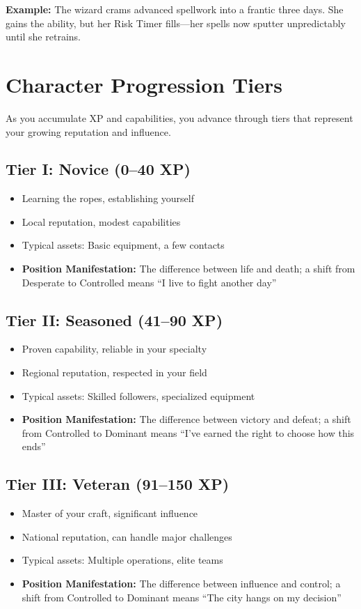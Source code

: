 \documentclass[11pt,twoside,openany]{book}
\begin{document}
\textbf{Example:} The wizard crams advanced spellwork into a frantic three days. She gains the ability, but her Risk Timer fills---her spells now sputter unpredictably until she retrains.

\section*{Character Progression Tiers}

As you accumulate XP and capabilities, you advance through tiers that represent your growing reputation and influence.

\subsection{Tier I: Novice (0--40 XP)}
\begin{itemize}
\item Learning the ropes, establishing yourself
\item Local reputation, modest capabilities
\item Typical assets: Basic equipment, a few contacts
\item \textbf{Position Manifestation:} The difference between life and death; a shift from Desperate to Controlled means ``I live to fight another day''
\end{itemize}

\subsection{Tier II: Seasoned (41--90 XP)}
\begin{itemize}
\item Proven capability, reliable in your specialty
\item Regional reputation, respected in your field
\item Typical assets: Skilled followers, specialized equipment
\item \textbf{Position Manifestation:} The difference between victory and defeat; a shift from Controlled to Dominant means ``I've earned the right to choose how this ends''
\end{itemize}

\subsection{Tier III: Veteran (91--150 XP)}
\begin{itemize}
\item Master of your craft, significant influence
\item National reputation, can handle major challenges
\item Typical assets: Multiple operations, elite teams
\item \textbf{Position Manifestation:} The difference between influence and control; a shift from Controlled to Dominant means ``The city hangs on my decision''
\end{itemize}
\end{document}
